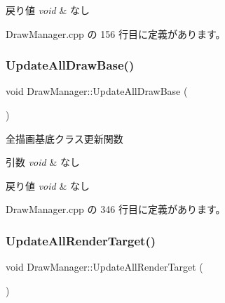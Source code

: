 \begin{DoxyRetVals}{戻り値}
{\em void} & なし \\
\hline
\end{DoxyRetVals}


 Draw\+Manager.\+cpp の 156 行目に定義があります。

\mbox{\label{class_draw_manager_a7c989a2beae5de5a1fc7ab0bef8692f9}} 
\subsubsection{\texorpdfstring{Update\+All\+Draw\+Base()}{UpdateAllDrawBase()}}
{\footnotesize\ttfamily void Draw\+Manager\+::\+Update\+All\+Draw\+Base (\begin{DoxyParamCaption}{ }\end{DoxyParamCaption})\hspace{0.3cm}{\ttfamily [private]}}



全描画基底クラス更新関数 


\begin{DoxyParams}{引数}
{\em void} & なし \\
\hline
\end{DoxyParams}

\begin{DoxyRetVals}{戻り値}
{\em void} & なし \\
\hline
\end{DoxyRetVals}


 Draw\+Manager.\+cpp の 346 行目に定義があります。

\mbox{\label{class_draw_manager_a8eb2f1e3957113ae99e8240c40c89744}} 
\subsubsection{\texorpdfstring{Update\+All\+Render\+Target()}{UpdateAllRenderTarget()}}
{\footnotesize\ttfamily void Draw\+Manager\+::\+Update\+All\+Render\+Target (\begin{DoxyParamCaption}{ }\end{DoxyParamCaption})\hspace{0.3cm}{\ttfamily [private]}}



